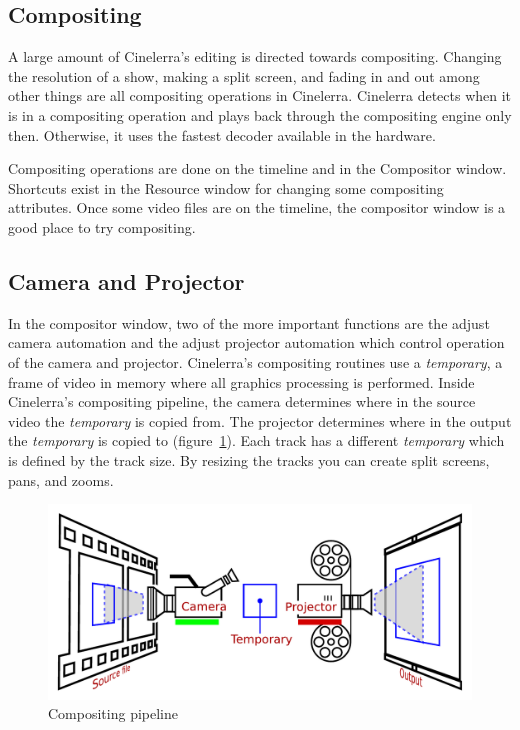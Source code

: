 \subsection{Compositing}%
\label{sub:compositing}

A large amount of Cinelerra's editing is directed towards compositing. 
Changing the resolution of a show, making a split screen, and fading in and out among other things are all compositing operations in Cinelerra. 
Cinelerra detects when it is in a compositing operation and plays back through the compositing engine only then. 
Otherwise, it uses the fastest decoder available in the hardware.

Compositing operations are done on the timeline and in the Compositor window. Shortcuts exist in the Resource window for changing some compositing attributes. 
Once some video files are on the timeline, the compositor window is a good place to try compositing.

\subsection{Camera and Projector}%
\label{sub:camera_and_projector}

In the compositor window, two of the more important functions are the adjust camera automation and the adjust projector automation which control operation of the camera and projector. 
Cinelerra's compositing routines use a \textit{temporary}, a frame of video in memory where all graphics processing is performed. 
Inside Cinelerra's compositing pipeline, the camera determines where in the source video the \textit{temporary} is copied from. 
The projector determines where in the output the \textit{temporary} is copied to (figure~\ref{fig:temporary-01}). 
Each track has a different \textit{temporary} which is defined by the track size. By resizing the tracks you can create split screens, pans, and zooms.

\begin{figure}[htpb]
    \centering
    \includegraphics[width=0.8\linewidth]{images/temporary-01.pdf}
    \caption{Compositing pipeline}
    \label{fig:temporary-01}
\end{figure}

